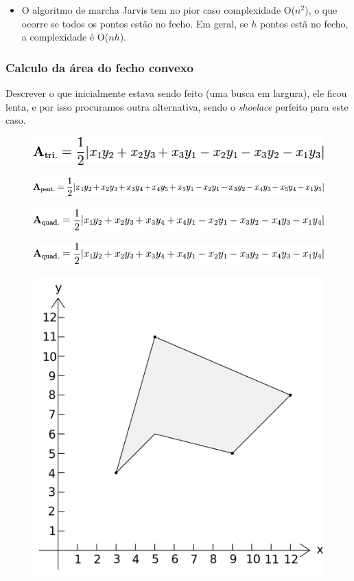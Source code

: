 \documentclass[12pt]{article}
\begin{document}
\begin{itemize}
\item O algoritmo de marcha Jarvis tem no pior caso complexidade O($n^2$), o que ocorre se todos os pontos estão no fecho. Em geral, se $h$ pontos estã no fecho, a complexidade é O($nh$).


\end{itemize}

\subsubsection{Calculo da área do fecho convexo}

Descrever o que inicialmente estava sendo feito (uma busca em largura), ele ficou lenta, e por isso procuramos outra alternativa, sendo o {\em shoelace} perfeito para este caso.


\begin{figure}[ht]
\centering
\includegraphics[width=.7\textwidth]{equacao1.png}
\label{fig:fig}
\end{figure}
\begin{figure}[ht]
\centering
\includegraphics[width=.7\textwidth]{equcao2.png}
\label{fig:fig}
\end{figure}
\begin{figure}[ht]
\centering
\includegraphics[width=.7\textwidth]{equacao4.png}
\label{fig:fig}
\end{figure}
\begin{figure}
\includegraphics[width=.7\textwidth]{equacao4.png}
\label{fig:fig}
\end{figure}
\begin{figure}
\includegraphics[width=.7\textwidth]{equacao5.png}
\label{fig:fig}
\end{figure}
\end{document}
